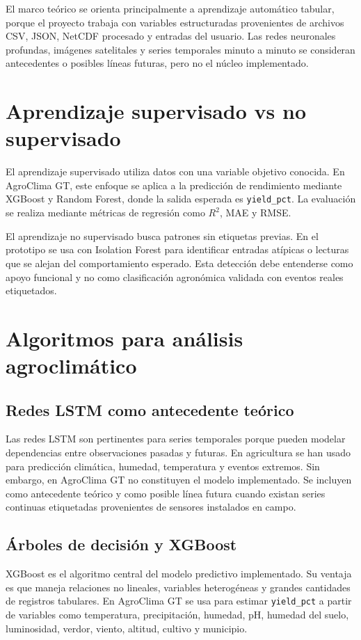 \documentclass[12pt,letterpaper,oneside]{report}
\newcommand{\codigo}[1]{\texttt{#1}}
\begin{document}
El marco teórico se orienta principalmente a aprendizaje automático tabular, porque el proyecto trabaja con variables estructuradas provenientes de archivos CSV, JSON, NetCDF procesado y entradas del usuario. Las redes neuronales profundas, imágenes satelitales y series temporales minuto a minuto se consideran antecedentes o posibles líneas futuras, pero no el núcleo implementado.

\section{Aprendizaje supervisado vs no supervisado}
El aprendizaje supervisado utiliza datos con una variable objetivo conocida. En AgroClima GT, este enfoque se aplica a la predicción de rendimiento mediante XGBoost y Random Forest, donde la salida esperada es \codigo{yield\_pct}. La evaluación se realiza mediante métricas de regresión como $R^2$, MAE y RMSE.

El aprendizaje no supervisado busca patrones sin etiquetas previas. En el prototipo se usa con Isolation Forest para identificar entradas atípicas o lecturas que se alejan del comportamiento esperado. Esta detección debe entenderse como apoyo funcional y no como clasificación agronómica validada con eventos reales etiquetados.

\section{Algoritmos para análisis agroclimático}

\subsection{Redes LSTM como antecedente teórico}
Las redes LSTM son pertinentes para series temporales porque pueden modelar dependencias entre observaciones pasadas y futuras. En agricultura se han usado para predicción climática, humedad, temperatura y eventos extremos. Sin embargo, en AgroClima GT no constituyen el modelo implementado. Se incluyen como antecedente teórico y como posible línea futura cuando existan series continuas etiquetadas provenientes de sensores instalados en campo.

\subsection{Árboles de decisión y XGBoost}
XGBoost es el algoritmo central del modelo predictivo implementado. Su ventaja es que maneja relaciones no lineales, variables heterogéneas y grandes cantidades de registros tabulares. En AgroClima GT se usa para estimar \codigo{yield\_pct} a partir de variables como temperatura, precipitación, humedad, pH, humedad del suelo, luminosidad, verdor, viento, altitud, cultivo y municipio.
\end{document}
